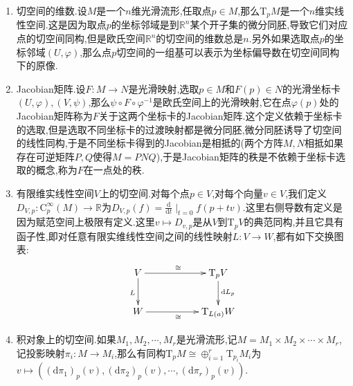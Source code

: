 \begin{enumerate}
\begin{proof}
    	\qquad
    	
    	验证单射,因为如果几何切向量$v$使得$D_{v,p}=0$,把它作用在坐标函数$x^i$上得到$0=D_{v,p}(x^i)=v^i$,于是$v=0$.验证满射,任取方向导数$D$,设$D(x^i)=v^i$,记$v=(v^1,v^2,\cdots,v^n)$,我们断言$D_v=D$.任取$p$局部上的光滑函数$f$,按照泰勒展开有:
    	$$f(x)=f(p)+\sum_{i=1}^n\frac{\partial f}{\partial x^i}(p)(x^i-p^i)+\sum_{i,j=1}^n(x^i-p^i)(x^j-p^j)\int_0^1(1-t)\frac{\partial^2f}{\partial x^i\partial x^j}(p+t(x-p))\mathrm{d}t$$
    	
    	这里最后一个和式在方向导数的作用下为零.第一项常数项在方向导数的作用下也是零,于是最后只需验证:
    	\begin{align*}
    	Df&=\sum_{i=1}^nD(\frac{\partial f}{\partial x^i}(p)(x^i-p^i))\\&=\sum_{i=1}^n\frac{\partial f}{\partial x^i}(p)D(x^i)\\&=\sum_{i=1}^n\frac{\partial f}{\partial x^i}(p)v^i=D_v(f)
    	\end{align*}
    \end{proof}
    \item 切空间的维数.设$M$是一个$n$维光滑流形,任取点$p\in M$,那么$\mathrm{T}_pM$是一个$n$维实线性空间.这是因为取点$p$的坐标邻域是到$\mathbb{R}^n$某个开子集的微分同胚,导致它们对应点的切空间同构,但是欧氏空间$\mathbb{R}^n$的切空间的维数总是$n$.另外如果选取点$p$的坐标邻域$(U,\varphi)$,那么点$p$切空间的一组基可以表示为坐标偏导数在切空间同构下的原像.
    \item Jacobian矩阵.设$F:M\to N$是光滑映射,选取$p\in M$和$F(p)\in N$的光滑坐标卡$(U,\varphi),(V,\psi)$,那么$\psi\circ F\circ\varphi^{-1}$是欧氏空间上的光滑映射,它在点$\varphi(p)$处的Jacobian矩阵称为$F$关于这两个坐标卡的Jacobian矩阵.这个定义依赖于坐标卡的选取,但是选取不同坐标卡的过渡映射都是微分同胚,微分同胚诱导了切空间的线性同构,于是不同坐标卡得到的Jacobian是相抵的(两个方阵$M,N$相抵如果存在可逆矩阵$P,Q$使得$M=PNQ$),于是Jacobian矩阵的秩是不依赖于坐标卡选取的概念,称为$F$在一点处的秩.
    \item 有限维实线性空间$V$上的切空间.对每个点$p\in V$,对每个向量$v\in V$,我们定义$D_{V,p}:\mathrm{C}^{\infty}_p(M)\to\mathbb{R}$为$D_{V,p}(f)=\frac{\mathrm{d}}{\mathrm{d}t}\mid_{t=0}f(p+tv)$.这里右侧导数有定义是因为赋范空间上极限有定义.这里$v\mapsto D_{v,p}$是从$V$到$\mathrm{T}_pV$的典范同构,并且它具有函子性,即对任意有限实维线性空间之间的线性映射$L:V\to W$,都有如下交换图表:
    $$\xymatrix{V\ar[rr]^{\cong}\ar[d]_L&&\mathrm{T}_pV\ar[d]^{\mathrm{d}L_p}\\W\ar[rr]_{\cong}&&\mathrm{T}_{L(a)}W}$$
    \item 积对象上的切空间.如果$M_1,M_2,\cdots,M_r$是光滑流形,记$M=M_1\times M_2\times\cdots\times M_r$,记投影映射$\pi_i:M\to M_i$,那么有同构$\mathrm{T}_pM\cong\oplus_{i=1}^r\mathrm{T}_{p_i}M_i$为$v\mapsto\left((\mathrm{d}\pi_1)_p(v),(\mathrm{d}\pi_2)_p(v),\cdots,(\mathrm{d}\pi_r)_p(v)\right)$.

\end{enumerate}
